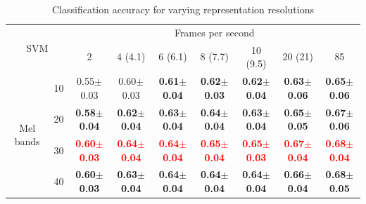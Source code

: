 \documentclass[final,3p,times,twocolumn]{elsarticle}
\begin{document}
\begin{table}[h]
\centering
\caption{Classification accuracy for varying representation resolutions}
\label{T1}
\begin{tabular}{ll|c|c|c|c|c|c|c|}
\cline{3-9}
\multicolumn{2}{c}{\multirow{2}{*}{SVM}} & \multicolumn{7}{|c|}{Frames per second}\\ \cline{3-9}
 & & 2 & 4 (4.1) & 6 (6.1) & 8 (7.7) & 10 (9.5) & 20 (21) & 85 \\ \cline{1-9}
\multicolumn{1}{|c}{\multirow{4}{*}{Mel bands}}
 & \multicolumn{1}{|c|}{10} & 0.55$\pm$0.03 & 0.60$\pm$0.03 & \textbf{0.61$\pm$0.04} & \textbf{0.62$\pm$0.03} & \textbf{0.62$\pm$0.04} & \textbf{0.63$\pm$0.06} & \textbf{0.65$\pm$0.06} \\ \cline{2-9}
\multicolumn{1}{|c}{}
 & \multicolumn{1}{|c|}{20} & \textbf{0.58$\pm$0.04} & \textbf{0.62$\pm$0.04} & \textbf{0.63$\pm$0.04} & \textbf{0.64$\pm$0.04} & \textbf{0.63$\pm$0.04} & \textbf{0.65$\pm$0.05} & \textbf{0.67$\pm$0.06} \\ \cline{2-9}
\multicolumn{1}{|c}{}
 & \multicolumn{1}{|c|}{30} & \textbf{\textcolor{red}{0.60$\pm$0.03}} & \textbf{\textcolor{red}{0.64$\pm$0.04}} & \textbf{\textcolor{red}{0.64$\pm$0.04}} & \textbf{\textcolor{red}{0.65$\pm$0.04}} & \textbf{\textcolor{red}{0.65$\pm$0.03}} & \textbf{\textcolor{red}{0.67$\pm$0.04}} & \textbf{\textcolor{red}{0.68$\pm$0.04}} \\ \cline{2-9}
\multicolumn{1}{|c}{}
 & \multicolumn{1}{|c|}{40} & \textbf{0.60$\pm$0.03} & \textbf{0.63$\pm$0.04} & \textbf{0.64$\pm$0.04} & \textbf{0.64$\pm$0.04} & \textbf{0.64$\pm$0.04} & \textbf{0.66$\pm$0.04} & \textbf{0.68$\pm$0.05} \\ \cline{1-9}
\end{tabular}


\end{table}
\end{document}
